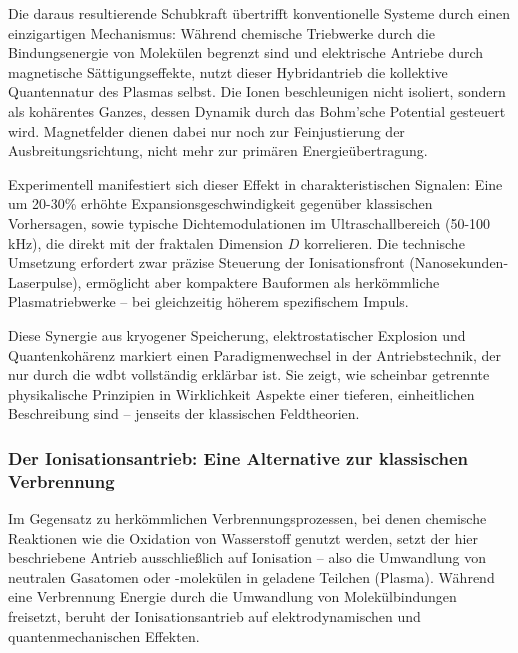 Die daraus resultierende Schubkraft übertrifft konventionelle Systeme durch einen einzigartigen Mechanismus: Während chemische Triebwerke durch die Bindungsenergie von Molekülen begrenzt sind und
elektrische Antriebe durch magnetische Sättigungseffekte, nutzt dieser Hybridantrieb die kollektive Quantennatur des Plasmas selbst. Die Ionen beschleunigen nicht isoliert, sondern als kohärentes
Ganzes, dessen Dynamik durch das Bohm'sche Potential gesteuert wird. Magnetfelder dienen dabei nur noch zur Feinjustierung der Ausbreitungsrichtung, nicht mehr zur primären Energieübertragung.

Experimentell manifestiert sich dieser Effekt in charakteristischen Signalen: Eine um 20-30\% erhöhte Expansionsgeschwindigkeit gegenüber klassischen Vorhersagen, sowie typische Dichtemodulationen
im Ultraschallbereich (50-100 kHz), die direkt mit der fraktalen Dimension $D$ korrelieren. Die technische Umsetzung erfordert zwar präzise Steuerung der Ionisationsfront (Nanosekunden-Laserpulse),
ermöglicht aber kompaktere Bauformen als herkömmliche Plasmatriebwerke – bei gleichzeitig höherem spezifischem Impuls.

Diese Synergie aus kryogener Speicherung, elektrostatischer Explosion und Quantenkohärenz markiert einen Paradigmenwechsel in der Antriebstechnik, der nur durch die \gls{wdbt} vollständig erklärbar
ist. Sie zeigt, wie scheinbar getrennte physikalische Prinzipien in Wirklichkeit Aspekte einer tieferen, einheitlichen Beschreibung sind – jenseits der klassischen Feldtheorien.

\subsubsection{Der Ionisationsantrieb: Eine Alternative zur klassischen Verbrennung}
Im Gegensatz zu herkömmlichen Verbrennungsprozessen, bei denen chemische Reaktionen wie die Oxidation von Wasserstoff genutzt werden, setzt der hier beschriebene Antrieb ausschließlich auf
Ionisation – also die Umwandlung von neutralen Gasatomen oder -molekülen in geladene Teilchen (Plasma). Während eine Verbrennung Energie durch die Umwandlung von Molekülbindungen freisetzt, beruht der
Ionisationsantrieb auf elektrodynamischen und quantenmechanischen Effekten.


